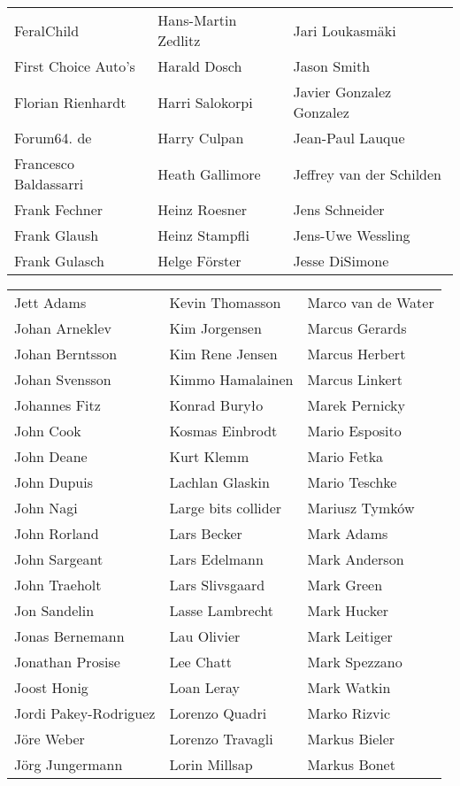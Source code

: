 \begin{small}
\begin{tabular}{p{4cm}p{4cm}p{4cm}}
FeralChild & Hans-Martin Zedlitz & Jari Loukasmäki \\
First Choice Auto's & Harald Dosch & Jason Smith \\
Florian Rienhardt & Harri Salokorpi & Javier Gonzalez Gonzalez \\
Forum64. de & Harry Culpan & Jean-Paul Lauque \\
Francesco Baldassarri & Heath Gallimore & Jeffrey van der Schilden \\
Frank Fechner & Heinz Roesner & Jens Schneider \\
Frank Glaush & Heinz Stampfli & Jens-Uwe Wessling \\
Frank Gulasch & Helge Förster & Jesse DiSimone \\
\end{tabular}
\newpage
\setlength{\tabcolsep}{1mm}
\begin{tabular}{p{4cm}p{4cm}p{4cm}}
Jett Adams & Kevin Thomasson & Marco van de Water \\
Johan Arneklev & Kim Jorgensen & Marcus Gerards \\
Johan Berntsson & Kim Rene Jensen & Marcus Herbert \\
Johan Svensson & Kimmo Hamalainen & Marcus Linkert \\
Johannes Fitz & Konrad Buryło & Marek Pernicky \\
John Cook & Kosmas Einbrodt & Mario Esposito \\
John Deane & Kurt Klemm & Mario Fetka \\
John Dupuis & Lachlan Glaskin & Mario Teschke \\
John Nagi & Large bits collider & Mariusz Tymków \\
John Rorland & Lars Becker & Mark Adams \\
John Sargeant & Lars Edelmann & Mark Anderson \\
John Traeholt & Lars Slivsgaard & Mark Green \\
Jon Sandelin & Lasse Lambrecht & Mark Hucker \\
Jonas Bernemann & Lau Olivier & Mark Leitiger \\
Jonathan Prosise & Lee Chatt & Mark Spezzano \\
Joost Honig & Loan Leray & Mark Watkin \\
Jordi Pakey-Rodriguez & Lorenzo Quadri & Marko Rizvic \\
Jöre Weber & Lorenzo Travagli & Markus Bieler \\
Jörg Jungermann & Lorin Millsap & Markus Bonet \\

\end{tabular}
\end{small}
